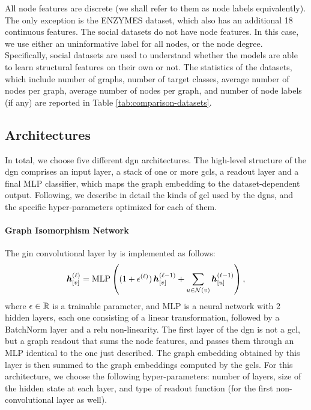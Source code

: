 All node features are discrete (we shall refer to them as node labels equivalently). The only exception is the ENZYMES dataset, which also has an additional 18 continuous features. The social datasets do not have node features. In this case, we use either an uninformative label for all nodes, or the node degree. Specifically, social datasets are used to understand whether the models are able to learn structural features on their own or not. The statistics of the datasets, which include number of graphs, number of target classes, average number of nodes per graph, average number of nodes per graph, and number of node labels (if any) are reported in Table \ref{tab:comparison-datasets}.


\subsection{Architectures}\label{sec:comparison-architectures}
In total, we choose five different \gls{dgn} architectures. The high-level structure of the \gls{dgn} comprises an input layer, a stack of one or more \glspl{gcl}, a readout layer and a final MLP classifier, which maps the graph embedding to the dataset-dependent output. Following, we describe in detail the kinds of \gls{gcl} used by the \glspl{dgn}, and the specific hyper-parameters optimized for each of them.

\paragraph{Graph Isomorphism Network} The \gls{gin} convolutional layer by \cite{xu2019gin} is implemented as follows:
$$\StateVector{v}{\ell} = \Fun{MLP} \Par{(1 + \epsilon^{(\ell)})\,\Elem{h}{v}^{(\ell-1)} + \sum_{u \in \Neigh(v)} \StateVector{u}{\ell-1}},$$
where $\epsilon \in \mathbb{R}$ is a trainable parameter, and MLP is a neural network with 2 hidden layers, each one consisting of a linear transformation, followed by a BatchNorm layer and a \gls{relu} non-linearity. The first layer of the \gls{dgn} is not a \gls{gcl}, but a graph readout that sums the node features, and passes them through an MLP identical to the one just described. The graph embedding obtained by this layer is then summed to the graph embeddings computed by the \glspl{gcl}. For this architecture, we choose the following hyper-parameters: number of layers, size of the hidden state at each layer, and type of readout function (for the first non-convolutional layer as well).

